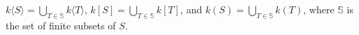 $k\langle S \rangle = \bigcup_{T \in \mathbb{S}} k\langle T \rangle$, $k[S] = \bigcup_{T \in \mathbb{S}} k[T]$, and $k(S) = \bigcup_{T \in \mathbb{S}} k(T)$, where $\mathbb{S}$ is the set of finite subsets of $S$.
